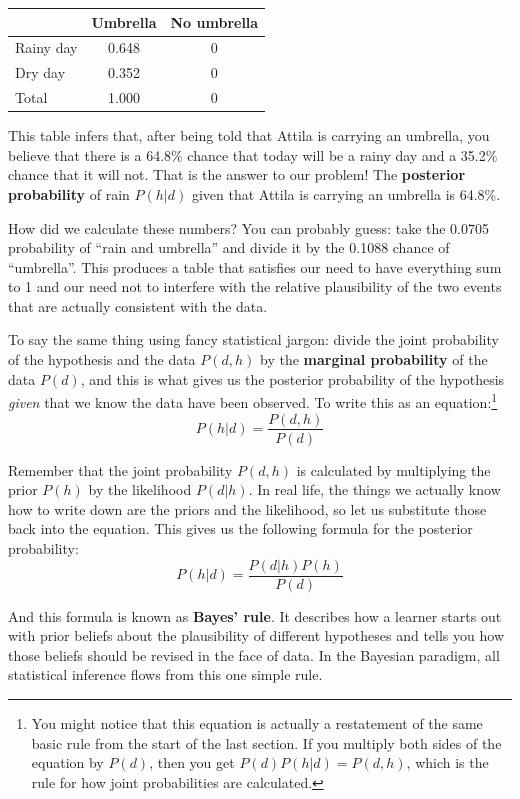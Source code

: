 \documentclass[
  11pt,
  a4paper,
  twoside,symmetric,openright]{book}
\theoremstyle{break}
\theoremstyle{break}
\begin{document}
\begin{longtable}[]{@{}lcc@{}}
\toprule\noalign{}
& Umbrella & No umbrella \\
\midrule\noalign{}
\endhead
\bottomrule\noalign{}
\endlastfoot
Rainy day & 0.648 & 0 \\
Dry day & 0.352 & 0 \\
Total & 1.000 & 0 \\
\end{longtable}

This table infers that, after being told that Attila is carrying an umbrella, you believe that there is a 64.8\% chance that today will be a rainy day and a 35.2\% chance that it will not. That is the answer to our problem! The \textbf{posterior probability} of rain \(P(h|d)\) given that Attila is carrying an umbrella is 64.8\%.

How did we calculate these numbers? You can probably guess: take the 0.0705 probability of ``rain and umbrella'' and divide it by the 0.1088 chance of ``umbrella''. This produces a table that satisfies our need to have everything sum to 1 and our need not to interfere with the relative plausibility of the two events that are actually consistent with the data.

To say the same thing using fancy statistical jargon: divide the joint probability of the hypothesis and the data \(P(d,h)\) by the \textbf{marginal probability} of the data \(P(d)\), and this is what gives us the posterior probability of the hypothesis \emph{given} that we know the data have been observed. To write this as an equation:\footnote{You might notice that this equation is actually a restatement of the same basic rule from the start of the last section. If you multiply both sides of the equation by \(P(d)\), then you get \(P(d) P(h| d) = P(d,h)\), which is the rule for how joint probabilities are calculated.}
\[
P(h | d) = \frac{P(d,h)}{P(d)}
\]

Remember that the joint probability \(P(d,h)\) is calculated by multiplying the prior \(P(h)\) by the likelihood \(P(d|h)\). In real life, the things we actually know how to write down are the priors and the likelihood, so let us substitute those back into the equation. This gives us the following formula for the posterior probability:
\[
P(h | d) = \frac{P(d|h) P(h)}{P(d)}
\]

And this formula is known as \textbf{Bayes' rule}. It describes how a learner starts out with prior beliefs about the plausibility of different hypotheses and tells you how those beliefs should be revised in the face of data. In the Bayesian paradigm, all statistical inference flows from this one simple rule.
\end{document}
